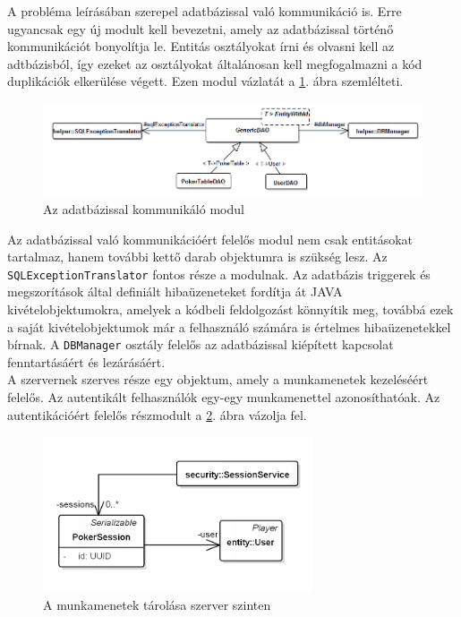 A probléma leírásában szerepel adatbázissal való kommunikáció is. Erre ugyancsak egy új modult kell bevezetni, amely az adatbázissal történő kommunikációt bonyolítja le. Entitás osztályokat írni és olvasni kell az adtbázisból, így ezeket az osztályokat általánosan kell megfogalmazni a kód duplikációk elkerülése végett. Ezen modul vázlatát a \ref{fig:persist}. ábra szemlélteti. \\
\begin{figure}[h!]
	\caption{Az adatbázissal kommunikáló modul}
	\label{fig:persist}
	\centering
	\includegraphics[width=\linewidth]{developer-documentation/images/dao.png}
\end{figure}
Az adatbázissal való kommunikációért felelős modul nem csak entitásokat tartalmaz, hanem további kettő darab objektumra is szükség lesz. Az \texttt{SQLExceptionTranslator} fontos része a modulnak. Az adatbázis triggerek és megszorítások által definiált hibaüzeneteket fordítja át JAVA kivételobjektumokra, amelyek a kódbeli feldolgozást könnyítik meg, továbbá ezek a saját kivételobjektumok már a felhasználó számára is értelmes hibaüzenetekkel bírnak. A \texttt{DBManager} osztály felelős az adatbázissal kiépített kapcsolat fenntartásáért és lezárásáért. \\
A szervernek szerves része egy objektum, amely a munkamenetek kezeléséért felelős. Az autentikált felhasználók egy-egy munkamenettel azonosíthatóak. Az autentikációért felelős részmodult a \ref{fig:sessionservice}. ábra vázolja fel.
\begin{figure}[h!]
	\caption{A munkamenetek tárolása szerver szinten}
	\label{fig:sessionservice}
	\centering
	\includegraphics[width=8cm]{developer-documentation/images/session.png}
\end{figure}
